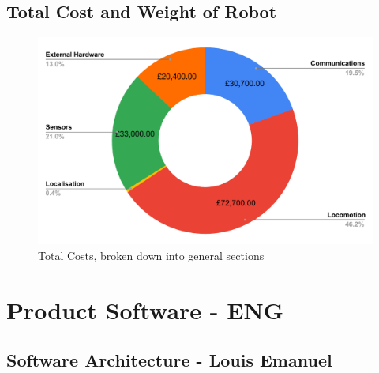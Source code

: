 \documentclass[11pt]{article}		%
\newlength{\imageheight}	 %
\begin{document}
   		\subsection{Total Cost and Weight of Robot}
	   		\begin{figure}[H]
	 		    \centering
	 		    \includegraphics[height=\imageheight]{costBreakdown}
	 		    \caption{Total Costs, broken down into general sections}
	 		    \label{costBreakdown}
	   		\end{figure}
		   
	
	\section{Product Software - ENG}
		\subsection[Software Architecture] {Software Architecture - Louis Emanuel}
        
\end{document}
